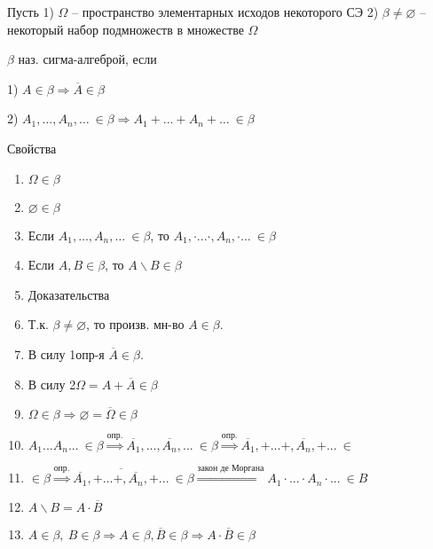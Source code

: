 Пусть 1) $\Omega$ -- пространство элементарных исходов некоторого СЭ 2) $\beta\neq\varnothing$ -- некоторый набор подмножеств в множестве $\Omega$

\OPR $\beta$ наз. сигма-алгеброй, если

1) $A\in\beta\Rightarrow\overline{A}\in\beta$ 

2) $A_1,\dots,A_n,\dots~\in \beta\Rightarrow A_1+ ... +A_n+\dots~\in \beta$

Свойства
\begin{enumerate}[topsep=0pt, leftmargin=20pt, noitemsep, label=\arabic*\degree]
	\item $\Omega\in \beta$
	
	\item $\varnothing\in \beta$
	
	\item Если $A_1,\dots,A_n,\dots~\in \beta$, то $A_1,\cdot...\cdot,A_n,\cdot\dots~\in \beta$
	
	\item Если $A, B\in \beta$, то $A\backslash B\in \beta$
	
	\item [] Доказательства
	
	\setcounter{enumi}{0}
	
	\item Т.к. $\beta\neq\varnothing$, то произв. мн-во $A\in \beta$. 
	\item [] В силу 1\degree опр-я $\overline{A}\in \beta$. 
	\item [] В силу 2\degree $\Omega = A+\overline{A}\in \beta$
	
	\item $\Omega\in \beta\Rightarrow\varnothing = \overline{\Omega}\in \beta$
	
	\item $A_1 ... A_n ... ~ \in \beta \stackrel{\text{опр.}}{\Rightarrow}\overline{A_1},...,\overline{A_n},... ~ \in \beta \stackrel{\text{опр.}}{\Rightarrow}\overline{A_1},+...+,\overline{A_n},+... ~ \in$
	\item [] $\in\beta\stackrel{\text{опр.}}{\Rightarrow}\overline{\overline{A_1},+...+,\overline{A_n},+...} ~ \in \beta\stackrel{\text{закон де Моргана}}{\Rightarrow}A_1\cdot...\cdot A_n \cdot... ~ \in B$ 
	
	\item $A\backslash B = A\cdot\overline{B}$
	\item [] $A\in \beta,~ B\in \beta\Rightarrow A\in \beta, \overline{B}\in \beta\Rightarrow A\cdot\overline{B}\in \beta$
\end{enumerate}

